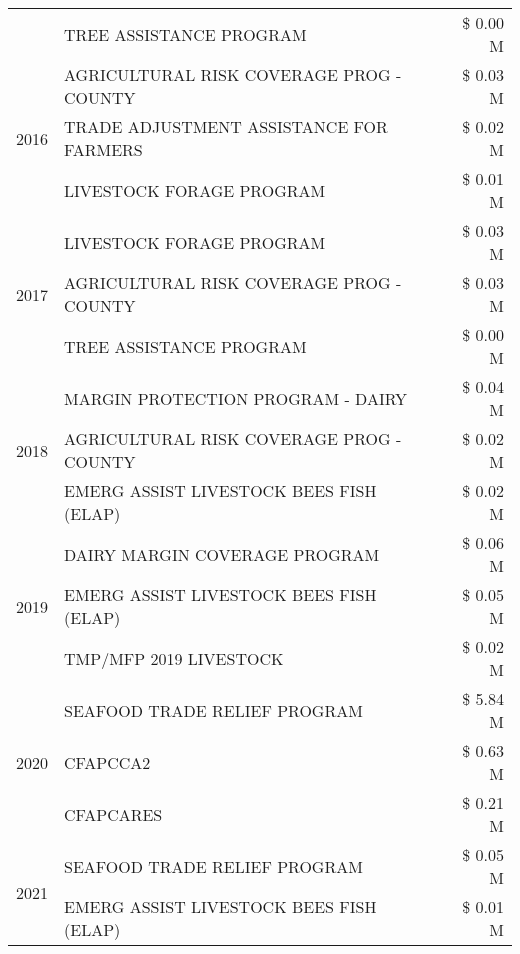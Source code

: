 \begin{tabular}{llr}
 & TREE ASSISTANCE PROGRAM & \$ 0.00 M \\
\cline{1-3}
\multirow[t]{3}{*}{2016} & AGRICULTURAL RISK COVERAGE PROG - COUNTY & \$ 0.03 M \\
 & TRADE ADJUSTMENT ASSISTANCE FOR FARMERS & \$ 0.02 M \\
 & LIVESTOCK FORAGE PROGRAM & \$ 0.01 M \\
\cline{1-3}
\multirow[t]{3}{*}{2017} & LIVESTOCK FORAGE PROGRAM & \$ 0.03 M \\
 & AGRICULTURAL RISK COVERAGE PROG - COUNTY & \$ 0.03 M \\
 & TREE ASSISTANCE PROGRAM & \$ 0.00 M \\
\cline{1-3}
\multirow[t]{3}{*}{2018} & MARGIN PROTECTION PROGRAM - DAIRY & \$ 0.04 M \\
 & AGRICULTURAL RISK COVERAGE PROG - COUNTY & \$ 0.02 M \\
 & EMERG ASSIST LIVESTOCK BEES FISH (ELAP) & \$ 0.02 M \\
\cline{1-3}
\multirow[t]{3}{*}{2019} & DAIRY MARGIN COVERAGE PROGRAM & \$ 0.06 M \\
 & EMERG ASSIST LIVESTOCK BEES FISH (ELAP) & \$ 0.05 M \\
 & TMP/MFP 2019 LIVESTOCK & \$ 0.02 M \\
\cline{1-3}
\multirow[t]{3}{*}{2020} & SEAFOOD TRADE RELIEF PROGRAM & \$ 5.84 M \\
 & CFAPCCA2 & \$ 0.63 M \\
 & CFAPCARES & \$ 0.21 M \\
\cline{1-3}
\multirow[t]{2}{*}{2021} & SEAFOOD TRADE RELIEF PROGRAM & \$ 0.05 M \\
 & EMERG ASSIST LIVESTOCK BEES FISH (ELAP) & \$ 0.01 M \\
\cline{1-3}
\bottomrule
\end{tabular}
